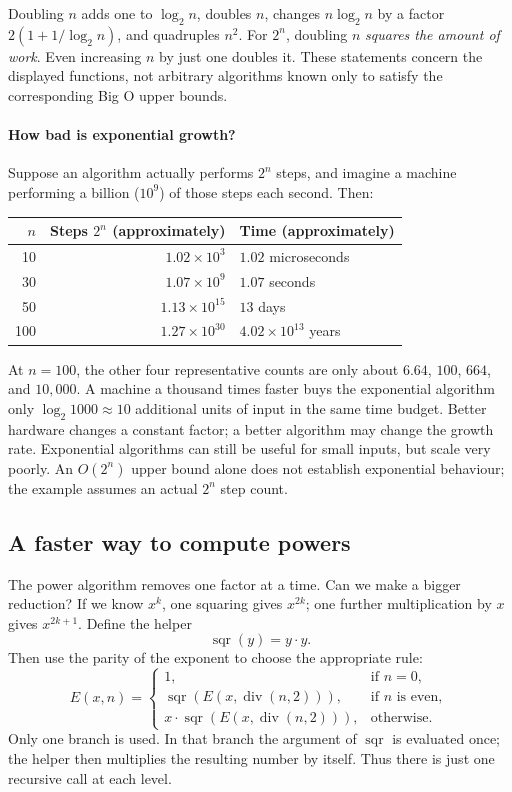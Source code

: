Doubling $n$ adds one to $\log_2 n$, doubles $n$, changes $n\log_2 n$
by a factor $2(1+1/\log_2 n)$, and quadruples $n^2$. For $2^n$, doubling
$n$ \emph{squares the amount of work}. Even increasing $n$ by just one
doubles it. These statements concern the displayed functions, not arbitrary
algorithms known only to satisfy the corresponding Big O upper bounds.

\paragraph{How bad is exponential growth?}
Suppose an algorithm actually performs $2^n$ steps, and imagine a machine
performing a billion ($10^9$) of those steps each second. Then:
\begin{center}
\begin{tabular}{r r l}
\hline
$n$ & Steps $2^n$ (approximately) & Time (approximately)\\
\hline
10 & $1.02\times10^3$ & $1.02$ microseconds\\
30 & $1.07\times10^9$ & $1.07$ seconds\\
50 & $1.13\times10^{15}$ & $13$ days\\
100 & $1.27\times10^{30}$ & $4.02\times10^{13}$ years\\
\hline
\end{tabular}
\end{center}
At $n=100$, the other four representative counts are only about $6.64$,
$100$, $664$, and $10{,}000$. A machine a thousand times faster buys the
exponential algorithm only $\log_2 1000\approx10$ additional units of input
in the same time budget. Better hardware changes a constant factor; a
better algorithm may change the growth rate. Exponential algorithms can
still be useful for small inputs, but scale very poorly. An $O(2^n)$ upper
bound alone does not establish exponential behaviour; the example assumes
an actual $2^n$ step count.

\subsection{A faster way to compute powers}
\label{sec:alg-fast-power}

The power algorithm removes one factor at a time. Can we make a bigger
reduction? If we know $x^k$, one squaring gives $x^{2k}$; one further
multiplication by $x$ gives $x^{2k+1}$. Define the helper
\[
\operatorname{sqr}(y)=y\cdot y.
\]
Then use the parity of the exponent to choose the appropriate rule:
\[
E(x,n)=\begin{cases}
1,&\text{if }n=0,\\
\operatorname{sqr}(E(x,\operatorname{div}(n,2))),&\text{if }n\text{ is even},\\
x\cdot\operatorname{sqr}(E(x,\operatorname{div}(n,2))),&\text{otherwise}.
\end{cases}
\]
Only one branch is used. In that branch the argument of $\operatorname{sqr}$
is evaluated once; the helper then multiplies the resulting number by itself.
Thus there is just one recursive call at each level.

